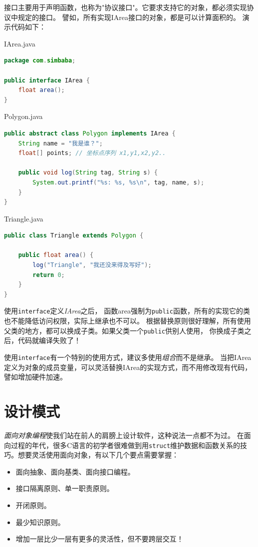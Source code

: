 接口主要用于声明函数，也称为"协议接口"。它要求支持它的对象，都必须实现协议中规定的接口。
譬如，所有实现IArea接口的对象，都是可以计算面积的。
演示代码如下：

\noindent IArea.java
\begin{lstlisting}[language=Java,mathescape]
package com.simbaba;

public interface IArea {
    float area();
}
\end{lstlisting}
\noindent Polygon.java
\begin{lstlisting}[language=Java,mathescape]
public abstract class Polygon implements IArea {
    String name = "我是谁？";
    float[] points; // 坐标点序列 x1,y1,x2,y2..

    public void log(String tag, String s) {
        System.out.printf("%s: %s, %s\n", tag, name, s);
    }
}
\end{lstlisting}
\noindent Triangle.java
\begin{lstlisting}[language=Java,mathescape]
public class Triangle extends Polygon {

    public float area() {
        log("Triangle", "我还没来得及写好");
        return 0;
    }
}
\end{lstlisting}

使用\lstinline{interface}定义\emph{IArea}之后，
函数area强制为\lstinline{public}函数，所有的实现它的类也不能降低访问权限，实际上继承也不可以。
根据替换原则很好理解，所有使用父类的地方，都可以换成子类。如果父类一个\lstinline{public}供别人使用，
你换成子类之后，代码就编译失败了！

使用\lstinline{interface}有一个特别的使用方式，建议多使用\emph{组合}而不是继承。
当把IArea定义为对象的成员变量，可以灵活替换IArea的实现方式，而不用修改现有代码，譬如增加硬件加速。

\section{设计模式}
\emph{面向对象编程}使我们站在前人的肩膀上设计软件，这种说法一点都不为过。
在面向过程的年代，很多C语言的初学者很难做到用\lstinline{struct}维护数据和函数关系的技巧。想要灵活使用面向对象，有以下几个要点需要掌握：

\begin{itemize}
\item [1.] 面向抽象、面向基类、面向接口编程。
\item [2.] 接口隔离原则、单一职责原则。
\item [3.] 开闭原则。
\item [4.] 最少知识原则。
\item [5.] 增加一层比少一层有更多的灵活性，但不要跨层交互！
\end{itemize}

